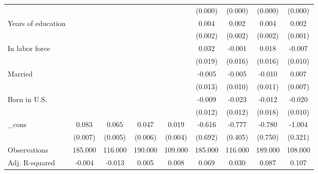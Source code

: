 \begin{table}[htbp]
{\begin{tabular}{l*{8}{c}}
          &                  &                  &                  &                  &  (0.000)         &  (0.000)         &  (0.000)         &  (0.000)         \\
Years of education&                  &                  &                  &                  &    0.004         &    0.002         &    0.004\sym{*}  &    0.002         \\
          &                  &                  &                  &                  &  (0.002)         &  (0.002)         &  (0.002)         &  (0.001)         \\
In labor force&                  &                  &                  &                  &    0.032\sym{*}  &   -0.001         &    0.018         &   -0.007         \\
          &                  &                  &                  &                  &  (0.019)         &  (0.016)         &  (0.016)         &  (0.010)         \\
Married   &                  &                  &                  &                  &   -0.005         &   -0.005         &   -0.010         &    0.007         \\
          &                  &                  &                  &                  &  (0.013)         &  (0.010)         &  (0.011)         &  (0.007)         \\
Born in U.S.&                  &                  &                  &                  &   -0.009         &   -0.023\sym{*}  &   -0.012         &   -0.020\sym{*}  \\
          &                  &                  &                  &                  &  (0.012)         &  (0.012)         &  (0.018)         &  (0.010)         \\
\_cons    &    0.083\sym{***}&    0.065\sym{***}&    0.047\sym{***}&    0.019\sym{***}&   -0.616         &   -0.777\sym{*}  &   -0.780         &   -1.004\sym{***}\\
          &  (0.007)         &  (0.005)         &  (0.006)         &  (0.004)         &  (0.692)         &  (0.405)         &  (0.750)         &  (0.321)         \\
\midrule
Observations&  185.000         &  116.000         &  190.000         &  109.000         &  185.000         &  116.000         &  189.000         &  108.000         \\
Adj. R-squared&   -0.004         &   -0.013         &    0.005         &    0.008         &    0.069         &    0.030         &    0.087         &    0.107         \\

\end{tabular}}
\end{table}
